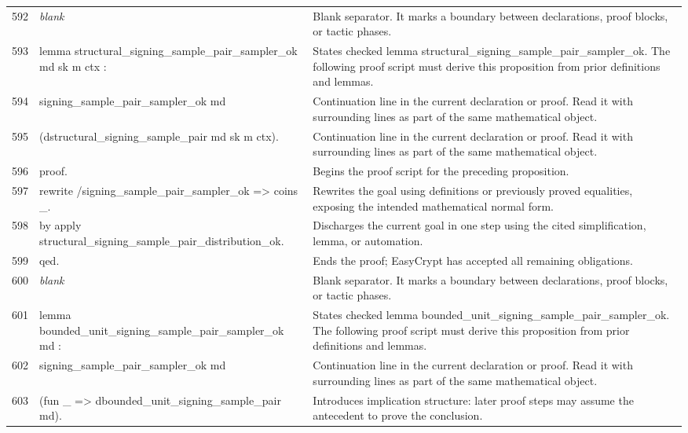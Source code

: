 \documentclass[10pt]{article}
\begin{document}
\begin{longtable}{r L{0.53\textwidth} L{0.37\textwidth}}
592 & {\ttfamily\scriptsize \emph{blank}} & Blank separator.  It marks a boundary between declarations, proof blocks, or tactic phases. \\
593 & {\ttfamily\scriptsize lemma structural\_signing\_sample\_pair\_sampler\_ok md sk m ctx :} & States checked lemma structural\_signing\_sample\_pair\_sampler\_ok.  The following proof script must derive this proposition from prior definitions and lemmas. \\
594 & {\ttfamily\scriptsize   signing\_sample\_pair\_sampler\_ok md} & Continuation line in the current declaration or proof.  Read it with surrounding lines as part of the same mathematical object. \\
595 & {\ttfamily\scriptsize     (dstructural\_signing\_sample\_pair md sk m ctx).} & Continuation line in the current declaration or proof.  Read it with surrounding lines as part of the same mathematical object. \\
596 & {\ttfamily\scriptsize proof.} & Begins the proof script for the preceding proposition. \\
597 & {\ttfamily\scriptsize rewrite /signing\_sample\_pair\_sampler\_ok => coins \_.} & Rewrites the goal using definitions or previously proved equalities, exposing the intended mathematical normal form. \\
598 & {\ttfamily\scriptsize by apply structural\_signing\_sample\_pair\_distribution\_ok.} & Discharges the current goal in one step using the cited simplification, lemma, or automation. \\
599 & {\ttfamily\scriptsize qed.} & Ends the proof; EasyCrypt has accepted all remaining obligations. \\
600 & {\ttfamily\scriptsize \emph{blank}} & Blank separator.  It marks a boundary between declarations, proof blocks, or tactic phases. \\
601 & {\ttfamily\scriptsize lemma bounded\_unit\_signing\_sample\_pair\_sampler\_ok md :} & States checked lemma bounded\_unit\_signing\_sample\_pair\_sampler\_ok.  The following proof script must derive this proposition from prior definitions and lemmas. \\
602 & {\ttfamily\scriptsize   signing\_sample\_pair\_sampler\_ok md} & Continuation line in the current declaration or proof.  Read it with surrounding lines as part of the same mathematical object. \\
603 & {\ttfamily\scriptsize     (fun \_ => dbounded\_unit\_signing\_sample\_pair md).} & Introduces implication structure: later proof steps may assume the antecedent to prove the conclusion. \\

\end{longtable}
\end{document}
